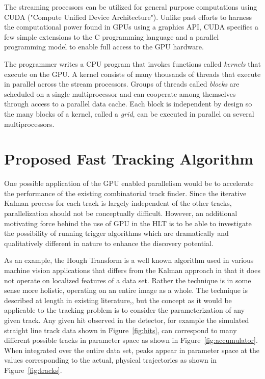 \documentclass{JINST}
\begin{document}
The streaming processors can be utilized for general purpose computations using
CUDA ("Compute Unified Device Architecture").  Unlike past efforts to harness
the computational power found in GPUs using a graphics API, CUDA specifies a
few simple extensions to the C programming language and a parallel programming
model to enable full access to the GPU hardware.

The programmer writes a CPU program that invokes functions called {\it kernels}
that execute on the GPU.  A kernel consists of many thousands of threads that
execute in parallel across the stream processors.  Groups of threads called
{\it blocks} are scheduled on a single multiprocessor and can cooperate among
themselves through access to a parallel data cache.  Each block is independent
by design so the many blocks of a kernel, called a {\it grid}, can be executed
in parallel on several multiprocessors.

\section{Proposed Fast Tracking Algorithm}

One possible application of the GPU enabled parallelism would be to
accelerate the performance of the existing combinatorial track finder.
Since the iterative Kalman process for each track is largely independent of the other tracks,
parallelization should not be conceptually difficult. However, an additional motivating 
force behind the use of GPU in the HLT is to be able to investigate the possibility of 
running trigger algorithms which are dramatically and qualitatively different in nature 
to enhance the discovery potential.

As an example, the Hough Transform is a well known algorithm used in various machine
vision applications that differs from the Kalman approach in that it does not operate on
localized features of a data set.  Rather the technique is in some sense more
holistic, operating on an entire image as a whole. 
The technique is described at length in existing literature\cite{bib:HT1},\cite{bib:HT2},
 but the concept as it would be applicable to the
tracking problem is to consider the parameterization of any given track.  Any given hit
observed in the detector, for example the simulated straight line track data shown in Figure~\ref{fig:hits}, 
can correspond to many different possible tracks in parameter space as shown in Figure~\ref{fig:accumulator}.  
When integrated over the entire data set, peaks appear in parameter space at the values corresponding to the actual, 
physical trajectories as shown in Figure~\ref{fig:tracks}.
\end{document}
